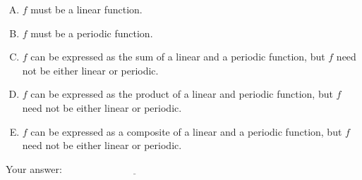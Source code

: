 \documentclass[10pt]{amsart}
\begin{document}
\begin{enumerate}
  \begin{enumerate}[(A)]

  \item $f$ must be a linear function.
  \item $f$ must be a periodic function.
  \item $f$ can be expressed as the sum of a linear and a periodic
    function, but $f$ need not be either linear or periodic.
  \item $f$ can be expressed as the product of a linear and periodic
    function, but $f$ need not be either linear or periodic.
  \item $f$ can be expressed as a composite of a linear and a periodic
    function, but $f$ need not be either linear or periodic.
  \end{enumerate}

  \vspace{0.1in}
  Your answer: $\underline{\qquad\qquad\qquad\qquad\qquad\qquad\qquad}$
  \vspace{1.5in}


\end{enumerate}
\end{document}
